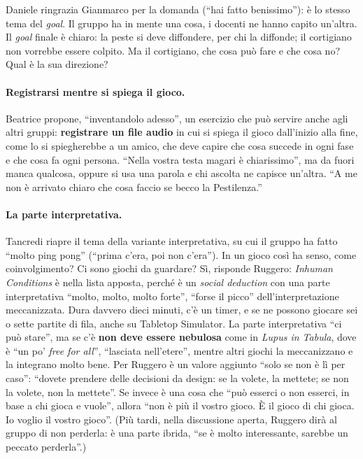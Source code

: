 Daniele ringrazia Gianmarco per la domanda (``hai fatto benissimo''): è lo stesso tema
del \emph{goal}. Il gruppo ha in mente una cosa, i docenti ne hanno capito un'altra. Il
\emph{goal} finale è chiaro: la peste si deve diffondere, per chi la diffonde; il
cortigiano non vorrebbe essere colpito. Ma il cortigiano, che cosa può fare e che cosa
no? Qual è la sua direzione?

\paragraph{Registrarsi mentre si spiega il gioco.} Beatrice propone, ``inventandolo
adesso'', un esercizio che può servire anche agli altri gruppi: \textbf{registrare un
file audio} in cui si spiega il gioco dall'inizio alla fine, come lo si spiegherebbe a un
amico, che deve capire che cosa succede in ogni fase e che cosa fa ogni persona.
``Nella vostra testa magari è chiarissimo'', ma da fuori manca qualcosa, oppure si usa
una parola e chi ascolta ne capisce un'altra. ``A me non è arrivato chiaro che cosa
faccio se becco la Pestilenza.''

\paragraph{La parte interpretativa.} Tancredi riapre il tema della variante
interpretativa, su cui il gruppo ha fatto ``molto ping pong'' (``prima c'era, poi non
c'era''). In un gioco così ha senso, come coinvolgimento? Ci sono giochi da guardare? Sì,
risponde Ruggero: \emph{Inhuman Conditions} è nella lista apposta, perché è un
\emph{social deduction} con una parte interpretativa ``molto, molto, molto forte'',
``forse il picco'' dell'interpretazione meccanizzata. Dura davvero dieci minuti, c'è un
timer, e se ne possono giocare sei o sette partite di fila, anche su Tabletop Simulator.
La parte interpretativa ``ci può stare'', ma se c'è \textbf{non deve essere nebulosa}
come in \emph{Lupus in Tabula}, dove è ``un po' \emph{free for all}'', ``lasciata
nell'etere'', mentre altri giochi la meccanizzano e la integrano molto bene. Per
Ruggero è un valore aggiunto ``solo se non è lì per caso'': ``dovete prendere delle
decisioni da design: se la volete, la mettete; se non la volete, non la mettete''. Se
invece è una cosa che ``può esserci o non esserci, in base a chi gioca e vuole'', allora
``non è più il vostro gioco. È il gioco di chi gioca. Io voglio il vostro gioco''. (Più
tardi, nella discussione aperta, Ruggero dirà al gruppo di non perderla: è una parte
ibrida, ``se è molto interessante, sarebbe un peccato perderla''.)

